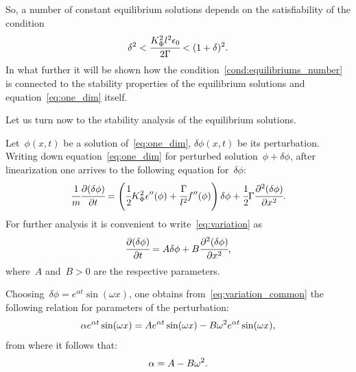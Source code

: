 So, a number of constant equilibrium solutions depends on the satisfiability
of the condition
\begin{equation}
	\delta^2 < \cfrac{K_\Phi^2 l^2 \epsilon_0}{2 \Gamma} < (1 + \delta)^2 {\text{.}}
	\label{cond:equilibriums_number}
\end{equation}
In what further it will be shown how the
condition~\eqref{cond:equilibriums_number} is connected to the
stability properties of the equilibrium solutions and
equation~\eqref{eq:one_dim} itself.

Let us turn now to the stability analysis of the equilibrium solutions.

Let~$\phi(x, t)$ be a solution of~\eqref{eq:one_dim}, $\delta \phi(x,
t)$ be its perturbation.
Writing down equation~\eqref{eq:one_dim} for perturbed solution~$\phi
+ \delta \phi$,
after linearization one arrives to the following equation for~$\delta\phi$:
\begin{equation}
  \cfrac{1}{m} \cfrac{\partial (\delta \phi)}{\partial t} = \left(\cfrac{1}{2} K_\Phi^2 \epsilon''(\phi) + \cfrac{\Gamma}{l^2} f''(\phi) \right) \delta \phi + \cfrac{1}{2} \Gamma \cfrac{\partial^2 (\delta \phi)}{\partial x^2} {\text{.}}
  \label{eq:variation}
\end{equation}
For further analysis it is convenient to write~\eqref{eq:variation} as
%
\begin{equation}
  \cfrac{\partial (\delta \phi)}{\partial t} = A \delta \phi + B \cfrac{\partial^2 (\delta \phi)}{\partial x^2} {\text{,}}
  \label{eq:variation_common}
\end{equation}
where~$A$ and~$B  > 0$ are the respective parameters.

Choosing~$\delta \phi = e^{\alpha t} \sin(\omega x)$, one obtains from~\eqref{eq:variation_common}
the following relation for parameters of the perturbation:
$$\alpha e^{\alpha t} \sin(\omega x) = A e^{\alpha t} \sin(\omega x) - B \omega^2 e^{\alpha t} \sin(\omega x) {\text{,}}$$
from where it follows that:
\begin{equation}
  \alpha = A - B \omega^2 {\text{.}}
  \label{eq:exponent_coefficient}
\end{equation}



